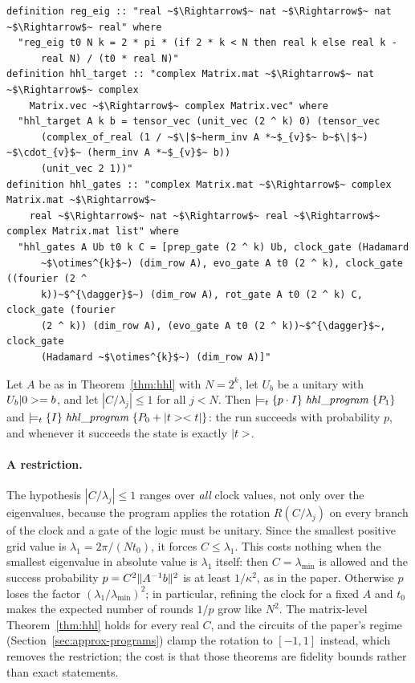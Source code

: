 \begin{lstlisting}[float=tp,caption={The specification of the HHL programs: grid eigenvalues, the target state, and the eight gates of Fig.~\ref{fig:hhl}},label={lst:spec}]
definition reg_eig :: "real ~$\Rightarrow$~ nat ~$\Rightarrow$~ nat ~$\Rightarrow$~ real" where
  "reg_eig t0 N k = 2 * pi * (if 2 * k < N then real k else real k -
      real N) / (t0 * real N)"
definition hhl_target :: "complex Matrix.mat ~$\Rightarrow$~ nat ~$\Rightarrow$~ complex
    Matrix.vec ~$\Rightarrow$~ complex Matrix.vec" where
  "hhl_target A k b = tensor_vec (unit_vec (2 ^ k) 0) (tensor_vec
      (complex_of_real (1 / ~$\|$~herm_inv A *~$_{v}$~ b~$\|$~) ~$\cdot_{v}$~ (herm_inv A *~$_{v}$~ b))
      (unit_vec 2 1))"
definition hhl_gates :: "complex Matrix.mat ~$\Rightarrow$~ complex Matrix.mat ~$\Rightarrow$~
    real ~$\Rightarrow$~ nat ~$\Rightarrow$~ real ~$\Rightarrow$~ complex Matrix.mat list" where
  "hhl_gates A Ub t0 k C = [prep_gate (2 ^ k) Ub, clock_gate (Hadamard
      ~$\otimes^{k}$~) (dim_row A), evo_gate A t0 (2 ^ k), clock_gate ((fourier (2 ^
      k))~$^{\dagger}$~) (dim_row A), rot_gate A t0 (2 ^ k) C, clock_gate (fourier
      (2 ^ k)) (dim_row A), (evo_gate A t0 (2 ^ k))~$^{\dagger}$~, clock_gate
      (Hadamard ~$\otimes^{k}$~) (dim_row A)]"
\end{lstlisting}

\begin{theorem}\label{thm:prog}
Let $A$ be as in Theorem~\ref{thm:hhl} with $N=2^k$, let $U_b$ be a unitary with $U_b|0>=b$, and let
$|C/\lambda_j|\le1$ for all $j<N$. Then
$\models_{t}\{p\cdot I\}\;\mathit{hhl\_program}\;\{P_1\}$ and
$\models_{t}\{I\}\;\mathit{hhl\_program}\;\{P_0+|t>< t|\}$: the run succeeds with probability $p$, and
whenever it succeeds the state is exactly $|t>$.
\end{theorem}

\paragraph{A restriction.} The hypothesis $|C/\lambda_j|\le1$ ranges over \emph{all} clock values, not only
over the eigenvalues, because the program applies the rotation $R(C/\lambda_j)$ on every branch of the
clock and a gate of the logic must be unitary. Since the smallest positive grid value is
$\lambda_1=2\pi/(Nt_0)$, it forces $C\le\lambda_1$. This costs nothing when the smallest eigenvalue in
absolute value is $\lambda_1$ itself: then $C=\lambda_{\min}$ is allowed and the success probability
$p=C^2\|A^{-1}b\|^2$ is at least $1/\kappa^2$, as in the paper. Otherwise $p$ loses the factor
$(\lambda_1/\lambda_{\min})^2$; in particular, refining the clock for a fixed $A$ and $t_0$ makes the
expected number of rounds $1/p$ grow like $N^2$. The matrix-level Theorem~\ref{thm:hhl} holds for every
real $C$, and the circuits of the paper's regime (Section~\ref{sec:approx-programs}) clamp the rotation
to $[-1,1]$ instead, which removes the restriction; the cost is that those theorems are fidelity bounds
rather than exact statements.

